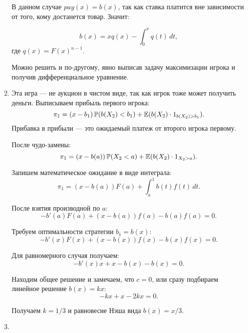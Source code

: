 \begin{enumerate}
В данном случае $ pay(x)=b(x) $, так как ставка платится вне зависимости от того, кому достанется товар. Значит:

\begin{equation}
\label{NE_all_pay}
b(x)=xq(x)-\int_{0}^{x}q(t) \, dt,
\end{equation}
где $ q(x)=F(x)^{n-1} $.

Можно решить и по-другому, явно выписав задачу максимизации игрока и получив дифференциальное уравнение.


\item Эта игра — не аукцион в чистом виде, так как игрок тоже может получить деньги.
Выписываем прибыль первого игрока:
\begin{equation}
\pi_{1}=(x-b_{1})\operatorname{\mathbb{P}}(b(X_{2})<b_{1})+\operatorname{\mathbb{E}}(b(X_{2})\cdot 1_{b(X_{2})>b_{1}}).
\end{equation}
Прибавка в прибыли — это ожидаемый платеж от второго игрока первому.

После чудо-замены:
\begin{equation}
\pi_{1}=(x-b(a))\operatorname{\mathbb{P}}(X_{2}<a)+\operatorname{\mathbb{E}}(b(X_{2})\cdot 1_{X_{2}>a}).
\end{equation}

Запишем математическое ожидание в виде интеграла:
\begin{equation}
\pi_{1}=(x-b(a))F(a)+\int_{a}^{1}b(t)f(t) \, dt.
\end{equation}

После взятия производной по $ a $:
\begin{equation}
-b'(a)F(a)+(x-b(a))f(a)-b(a)f(a)=0.
\end{equation}

Требуем оптимальности стратегии  $ b_{1}=b(x) $:
\begin{equation}
-b'(x)F(x)+(x-b(x))f(x)-b(x)f(x)=0.
\end{equation}

Для равномерного случая получаем:
\begin{equation}
-b'(x)x+x-b(x)-b(x)=0.
\end{equation}

Находим общее решение и замечаем, что $ c=0 $, или сразу подбираем линейное решение $ b(x)=kx $:
\begin{equation}
-kx+x-2kx=0.
\end{equation}

Получаем $ k=1/3 $ и равновесие Нэша вида $ b(x)=x/3 $.



\item


\end{enumerate}
